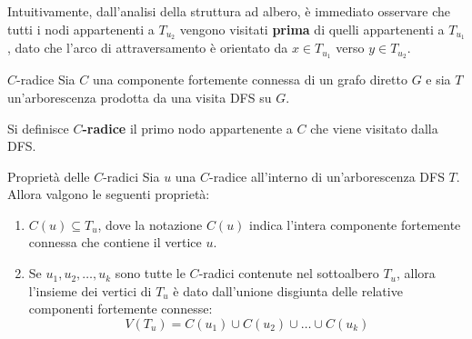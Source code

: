\documentclass[12pt]{report}
\begin{document}
\begin{figure}[H]
		\label{fig:arco_attraversamento}
	\end{figure}
	
	Intuitivamente, dall'analisi della struttura ad albero, è immediato osservare che tutti i nodi appartenenti a $T_{u_2}$ vengono visitati \textbf{prima} di quelli appartenenti a $T_{u_1}$, dato che l'arco di attraversamento è orientato da $x \in T_{u_1}$ verso $y \in T_{u_2}$.
	
	\begin{definizione}{$C$-radice}{}
		Sia $C$ una componente fortemente connessa di un grafo diretto $G$ e sia $T$ un'arborescenza prodotta da una visita DFS su $G$.
		
		Si definisce \textbf{$C$-radice} il primo nodo appartenente a $C$ che viene visitato dalla DFS.
	\end{definizione}
	
	\begin{proposizione}{Proprietà delle $C$-radici}{}
		Sia $u$ una $C$-radice all'interno di un'arborescenza DFS $T$. Allora valgono le seguenti proprietà:
		\begin{enumerate}
			\item $C(u) \subseteq T_u$, dove la notazione $C(u)$ indica l'intera componente fortemente connessa che contiene il vertice $u$.
			\item Se $u_1, u_2, \dots, u_k$ sono tutte le $C$-radici contenute nel sottoalbero $T_u$, allora l'insieme dei vertici di $T_u$ è dato dall'unione disgiunta delle relative componenti fortemente connesse:
			\[
			V(T_u) = C(u_1) \cup C(u_2) \cup \dots \cup C(u_k)
			\]
		\end{enumerate}
	\end{proposizione}
	
\end{document}
